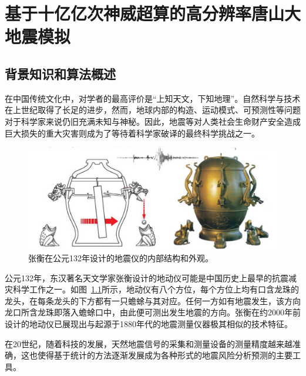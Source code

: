 \documentclass[degree=doctor]{thuthesis}
\begin{document}
\frontmatter

\tableofcontents




\mainmatter
\chapter{基于十亿亿次神威超算的高分辨率唐山大地震模拟}
\label{chap:earthquake}

\section{背景知识和算法概述}
\label{sec:earth_algorithm}

在中国传统文化中，对学者的最高评价是“上知天文，下知地理”。自然科学与技术在上世纪取得了长足的进步，然而，地球内部的构造、运动模式、可预测性等问题对于科学家来说仍旧充满未知与神秘。因此，地震等对人类社会生命财产安全造成巨大损失的重大灾害则成为了等待着科学家破译的最终科学挑战之一\citep{anderson1989theory}。

\begin{figure}[t]
\centering
\includegraphics[width=0.7\columnwidth]{seismoscope.png}
\caption{张衡在公元132年设计的地震仪的内部结构和外观\citep{hsiao2009review}。}
\label{fig:heng-scope}
\end{figure}

公元132年，东汉著名天文学家张衡设计的地动仪可能是中国历史上最早的抗震减灾科学工作之一\citep{stein2009introduction}。如图~\ref{fig:heng-scope}所示，地动仪有八个方位，每个方位上均有口含龙珠的龙头，在每条龙头的下方都有一只蟾蜍与其对应。任何一方如有地震发生，该方向龙口所含龙珠即落入蟾蜍口中，由此便可测出发生地震的方向\cite{seismoscopewiki}。张衡在约2000年前设计的地动仪已展现出与起源于1880年代的地震测量仪器极其相似的技术特征。

在20世纪，随着科技的发展，天然地震信号的采集和测量设备的测量精度越来越准确，这也使得基于统计的方法逐渐发展成为各种形式的地震风险分析预测的主要工具。
\end{document}
